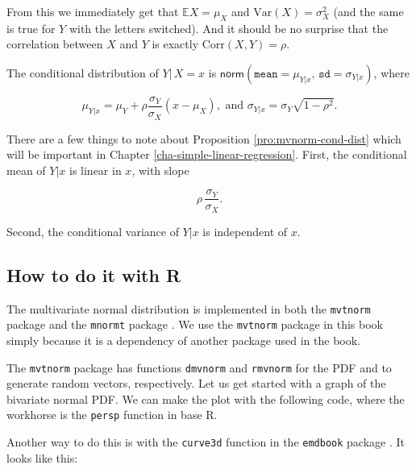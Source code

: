 \documentclass[]{book}
\numberwithin{equation}{chapter}
\numberwithin{figure}{chapter}
\theoremstyle{plain}
\theoremstyle{definition}
\theoremstyle{remark}
\theoremstyle{definition}
\theoremstyle{definition}
\theoremstyle{remark}
\let\BeginKnitrBlock\begin \let\EndKnitrBlock\end
\begin{document}
From this we immediately get that \(\mathbb{E} X=\mu_{X}\) and
\(\mbox{Var}(X)=\sigma_{X}^{2}\) (and the same is true for \(Y\) with
the letters switched). And it should be no surprise that the correlation
between \(X\) and \(Y\) is exactly \(\mbox{Corr}(X,Y)=\rho\).

\bigskip

\BeginKnitrBlock{proposition}
\protect\hypertarget{prp:mvnorm-cond-dist}{}{\label{prp:mvnorm-cond-dist}}The
conditional distribution of \(Y|\, X=x\) is
\(\mathsf{norm}(\mathtt{mean} = \mu_{Y|x}, \, \mathtt{sd} = \sigma_{Y|x})\),
where

\begin{equation}
\mu_{Y|x}=\mu_{Y}+\rho\frac{\sigma_{Y}}{\sigma_{X}}\left(x-\mu_{X}\right),\mbox{ and }\sigma_{Y|x}=\sigma_{Y}\sqrt{1-\rho^{2}}.
\end{equation}
\EndKnitrBlock{proposition}

There are a few things to note about Proposition
\ref{pro:mvnorm-cond-dist} which will be important in Chapter
\ref{cha-simple-linear-regression}. First, the conditional mean of
\(Y|x\) is linear in \(x\), with slope

\begin{equation}
\label{eq-population-slope-slr}
\rho\,\frac{\sigma_{Y}}{\sigma_{X}}.
\end{equation}

Second, the conditional variance of \(Y|x\) is independent of \(x\).

\subsection{How to do it with R}\label{how-to-do-it-with-r-30}

The multivariate normal distribution is implemented in both the
\texttt{mvtnorm} package \autocite{mvtnorm} and the \texttt{mnormt}
package \autocite{mnormt}. We use the \texttt{mvtnorm} package in this
book simply because it is a dependency of another package used in the
book.

The \texttt{mvtnorm} package has functions \texttt{dmvnorm} and
\texttt{rmvnorm} for the PDF and to generate random vectors,
respectively. Let us get started with a graph of the bivariate normal
PDF. We can make the plot with the following code, where the workhorse
is the \texttt{persp} function in base R.

Another way to do this is with the \texttt{curve3d} function in the
\texttt{emdbook} package \autocite{emdbook}. It looks like this:
\end{document}
